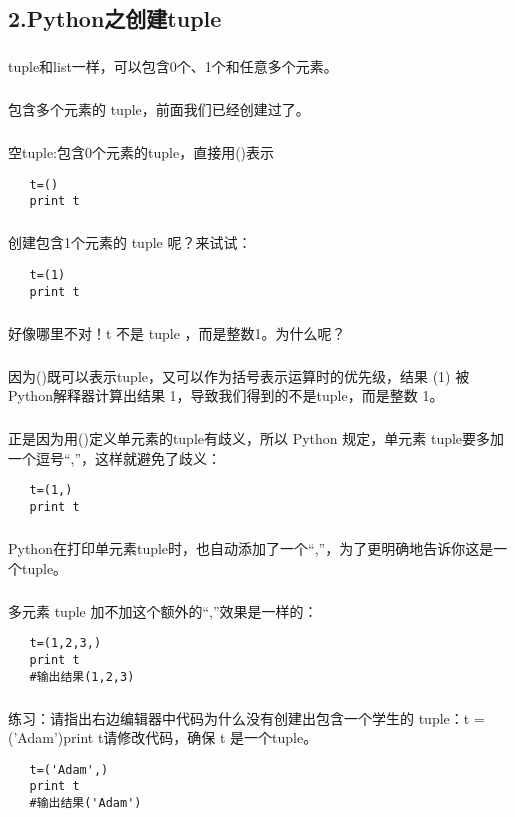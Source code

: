 \documentclass{article}
\begin{document}
\begin{CJK}{UTF8}{gbsn}
\section*{2.Python之创建tuple}
\subparagraph*{}
tuple和list一样，可以包含0个、1个和任意多个元素。
\subparagraph*{}
包含多个元素的 tuple，前面我们已经创建过了。
\subparagraph*{}
空tuple:包含0个元素的tuple，直接用()表示
\begin{verbatim}
   t=()
   print t
\end{verbatim}
\subparagraph*{}
创建包含1个元素的 tuple 呢？来试试：
\begin{verbatim}
   t=(1)
   print t
\end{verbatim}
\subparagraph*{}
好像哪里不对！t 不是 tuple ，而是整数1。为什么呢？
\subparagraph*{}
因为()既可以表示tuple，又可以作为括号表示运算时的优先级，结果 (1) 被Python解释器计算出结果 1，导致我们得到的不是tuple，而是整数 1。
\subparagraph*{}
正是因为用()定义单元素的tuple有歧义，所以 Python 规定，单元素 tuple要多加一个逗号“,”，这样就避免了歧义：
\begin{verbatim}
   t=(1,)
   print t
\end{verbatim}
\subparagraph*{}
Python在打印单元素tuple时，也自动添加了一个“,”，为了更明确地告诉你这是一个tuple。
\subparagraph*{}
多元素 tuple 加不加这个额外的“,”效果是一样的：
\begin{verbatim}
   t=(1,2,3,)
   print t
   #输出结果(1,2,3)
\end{verbatim}
\subparagraph*{}
练习：请指出右边编辑器中代码为什么没有创建出包含一个学生的 tuple：t = ('Adam')print t请修改代码，确保 t 是一个tuple。
\begin{verbatim}
   t=('Adam',)
   print t
   #输出结果('Adam')
\end{verbatim}

\end{CJK}
\end{document}
